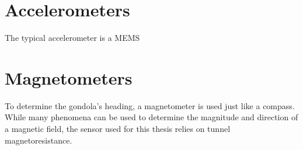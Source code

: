 \section{Accelerometers \label{sec:bg:accelerometers}}
The typical accelerometer is a \ac{MEMS}

\section{Magnetometers \label{sec:bg:magnetometers}}
To determine the gondola's heading, a magnetometer is used just like a compass. While many phenomena can be used to determine the magnitude and direction of a magnetic field, the sensor used for this thesis relies on tunnel magnetoresistance.